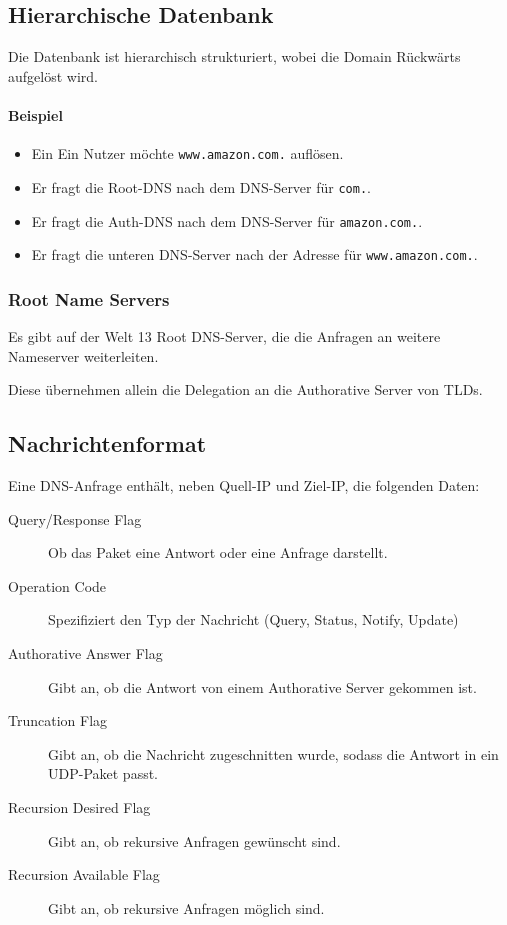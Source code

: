 \documentclass[a4paper, 11pt, accentcolor = tud3b]{tudreport}
\begin{document}
            \subsection{Hierarchische Datenbank} %
	            Die Datenbank ist hierarchisch strukturiert, wobei die Domain Rückwärts aufgelöst wird.
	            
	            \paragraph{Beispiel}
		            \begin{itemize}
		            	\item Ein Ein Nutzer möchte \texttt{www.amazon.com.} auflösen.
		            	\item Er fragt die Root-DNS nach dem DNS-Server für \texttt{com.}.
		            	\item Er fragt die Auth-DNS nach dem DNS-Server für \texttt{amazon.com.}.
		            	\item Er fragt die unteren DNS-Server nach der Adresse für \texttt{www.amazon.com.}.
		            \end{itemize}
            
                \subsubsection{Root Name Servers}
	                Es gibt auf der Welt 13 Root DNS-Server, die die Anfragen an weitere Nameserver weiterleiten.
	                
	                Diese übernehmen allein die Delegation an die Authorative Server von TLDs.

            \subsection{Nachrichtenformat}
	            Eine DNS-Anfrage enthält, neben Quell-IP und Ziel-IP, die folgenden Daten:
	            \begin{description}
	            	\item[Query/Response Flag] Ob das Paket eine Antwort oder eine Anfrage darstellt.
	            	\item[Operation Code] Spezifiziert den Typ der Nachricht (Query, Status, Notify, Update)
	            	\item[Authorative Answer Flag] Gibt an, ob die Antwort von einem Authorative Server gekommen ist.
	            	\item[Truncation Flag] Gibt an, ob die Nachricht zugeschnitten wurde, sodass die Antwort in ein UDP-Paket passt.
	            	\item[Recursion Desired Flag] Gibt an, ob rekursive Anfragen gewünscht sind.
	            	\item[Recursion Available Flag] Gibt an, ob rekursive Anfragen möglich sind.
	            \end{description}
\end{document}
